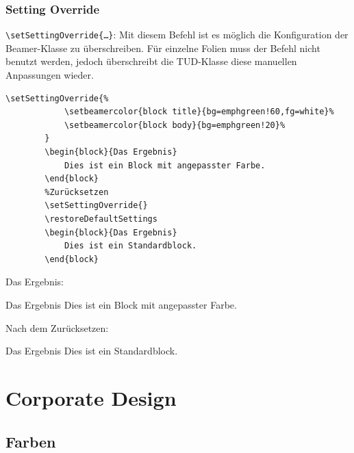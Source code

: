 \documentclass[german,notoc,draft]{tudbeamer}%
\begin{document}
\begin{frame}
	\frametitle{Setting Override}
\texttt{\textbackslash setSettingOverride\{\dots\}}:
	Mit diesem Befehl ist es möglich die Konfiguration der Beamer-Klasse zu überschreiben. Für einzelne Folien muss der Befehl nicht benutzt werden, jedoch überschreibt die TUD-Klasse diese manuellen Anpassungen wieder.
	\begin{lstlisting}[gobble=4,style=latex]
		\setSettingOverride{%					
		    \setbeamercolor{block title}{bg=emphgreen!60,fg=white}%
		    \setbeamercolor{block body}{bg=emphgreen!20}%
		}
		\begin{block}{Das Ergebnis}
			Dies ist ein Block mit angepasster Farbe. 
		\end{block}
		%Zurücksetzen
		\setSettingOverride{}
		\restoreDefaultSettings
		\begin{block}{Das Ergebnis}
			Dies ist ein Standardblock. 
		\end{block}
	\end{lstlisting}
\framebreak
	Das Ergebnis:
	\begin{block}{Das Ergebnis}
		Dies ist ein Block mit angepasster Farbe. 
	\end{block}
	Nach dem Zurücksetzen:
	\setSettingOverride{}
	\restoreDefaultSettings
	\begin{block}{Das Ergebnis}
		Dies ist ein Standardblock. 
	\end{block}
\end{frame}

\section{Corporate Design}
\subsection{Farben}
\end{document}
